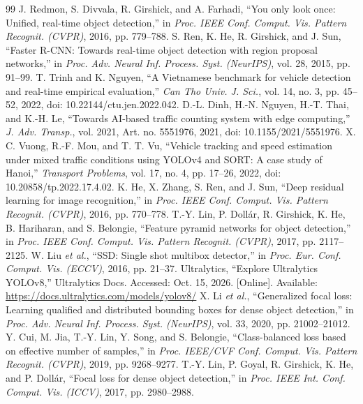 \documentclass[10pt,journal,a4paper]{IEEEtran}
\begin{document}
\begin{thebibliography}{99}
 J. Redmon, S. Divvala, R. Girshick, and A. Farhadi, ``You only look once: Unified, real-time object detection,'' in \textit{Proc. IEEE Conf. Comput. Vis. Pattern Recognit. (CVPR)}, 2016, pp. 779--788.
 S. Ren, K. He, R. Girshick, and J. Sun, ``Faster R-CNN: Towards real-time object detection with region proposal networks,'' in \textit{Proc. Adv. Neural Inf. Process. Syst. (NeurIPS)}, vol. 28, 2015, pp. 91--99.
 T. Trinh and K. Nguyen, ``A Vietnamese benchmark for vehicle detection and real-time empirical evaluation,'' \textit{Can Tho Univ. J. Sci.}, vol. 14, no. 3, pp. 45--52, 2022, doi: 10.22144/ctu.jen.2022.042.
 D.-L. Dinh, H.-N. Nguyen, H.-T. Thai, and K.-H. Le, ``Towards AI-based traffic counting system with edge computing,'' \textit{J. Adv. Transp.}, vol. 2021, Art. no. 5551976, 2021, doi: 10.1155/2021/5551976.
 X. C. Vuong, R.-F. Mou, and T. T. Vu, ``Vehicle tracking and speed estimation under mixed traffic conditions using YOLOv4 and SORT: A case study of Hanoi,'' \textit{Transport Problems}, vol. 17, no. 4, pp. 17--26, 2022, doi: 10.20858/tp.2022.17.4.02.
 K. He, X. Zhang, S. Ren, and J. Sun, ``Deep residual learning for image recognition,'' in \textit{Proc. IEEE Conf. Comput. Vis. Pattern Recognit. (CVPR)}, 2016, pp. 770--778.
 T.-Y. Lin, P. Doll\'ar, R. Girshick, K. He, B. Hariharan, and S. Belongie, ``Feature pyramid networks for object detection,'' in \textit{Proc. IEEE Conf. Comput. Vis. Pattern Recognit. (CVPR)}, 2017, pp. 2117--2125.
 W. Liu \textit{et al.}, ``SSD: Single shot multibox detector,'' in \textit{Proc. Eur. Conf. Comput. Vis. (ECCV)}, 2016, pp. 21--37.
 Ultralytics, ``Explore Ultralytics YOLOv8,'' Ultralytics Docs. Accessed: Oct. 15, 2026. [Online]. Available: \url{https://docs.ultralytics.com/models/yolov8/}
 X. Li \textit{et al.}, ``Generalized focal loss: Learning qualified and distributed bounding boxes for dense object detection,'' in \textit{Proc. Adv. Neural Inf. Process. Syst. (NeurIPS)}, vol. 33, 2020, pp. 21002--21012.
 Y. Cui, M. Jia, T.-Y. Lin, Y. Song, and S. Belongie, ``Class-balanced loss based on effective number of samples,'' in \textit{Proc. IEEE/CVF Conf. Comput. Vis. Pattern Recognit. (CVPR)}, 2019, pp. 9268--9277.
 T.-Y. Lin, P. Goyal, R. Girshick, K. He, and P. Doll\'ar, ``Focal loss for dense object detection,'' in \textit{Proc. IEEE Int. Conf. Comput. Vis. (ICCV)}, 2017, pp. 2980--2988.

\end{thebibliography}
\end{document}
